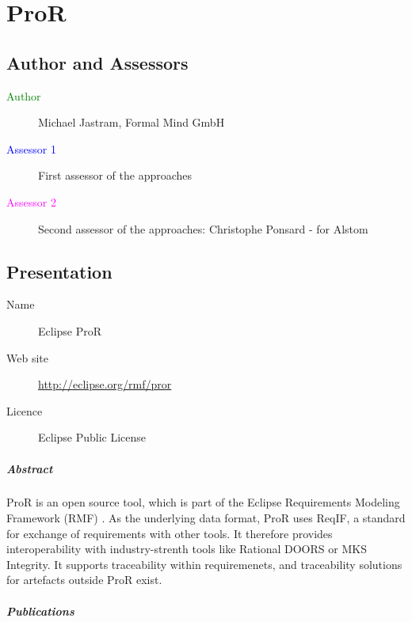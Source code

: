 \chapter{ProR}
\label{sec:pror}

\section{Author and Assessors}

\begin{description}
\item[\textcolor{green}{Author}] Michael Jastram, Formal Mind GmbH
\item[\textcolor{blue}{Assessor 1}] First assessor of the approaches 
\item[\textcolor{magenta}{Assessor 2}] Second assessor of the approaches: Christophe Ponsard - for Alstom
\end{description}

\section{Presentation}

\begin{description}
\item[Name] Eclipse ProR
\item[Web site] \url{http://eclipse.org/rmf/pror}
\item[Licence] Eclipse Public License
\end{description}

\paragraph{Abstract}

ProR is an open source tool, which is part of the Eclipse Requirements Modeling Framework (RMF) \cite{RMF}.  As the underlying data format, ProR uses ReqIF, a standard for exchange of requirements with other tools.  It therefore provides interoperability with industry-strenth tools like Rational DOORS or MKS Integrity.  It supports traceability within requiremenets, and traceability solutions for artefacts outside ProR exist.

\paragraph{Publications}

